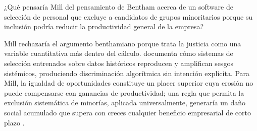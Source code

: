 \medskip

¿Qué pensaría Mill del pensamiento de Bentham acerca de un software de selección de personal que excluye a candidatos de grupos minoritarios porque su inclusión podría reducir la productividad general de la empresa?

Mill rechazaría el argumento benthamiano porque trata la justicia como una variable cuantitativa más dentro del cálculo. \citet{mishra2025moral} documenta cómo sistemas de selección entrenados sobre datos históricos reproducen y amplifican sesgos sistémicos, produciendo discriminación algorítmica sin intención explícita. Para Mill, la igualdad de oportunidades constituye un placer superior cuya erosión no puede compensarse con ganancias de productividad; una regla que permita la exclusión sistemática de minorías, aplicada universalmente, generaría un daño social acumulado que supera con creces cualquier beneficio empresarial de corto plazo \citep{mill2014utilitarismo}.

